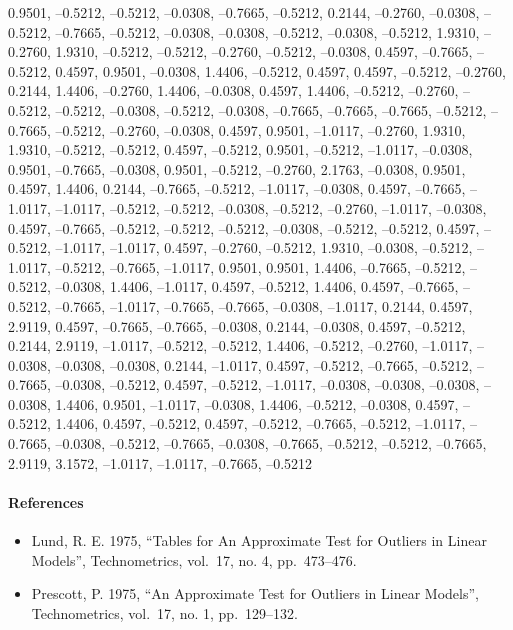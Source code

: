 \documentclass{article}
\begin{document}
0.9501, --0.5212, --0.5212, --0.0308, --0.7665, --0.5212, 0.2144,
--0.2760, --0.0308, --0.5212, --0.7665, --0.5212, --0.0308, --0.0308,
--0.5212, --0.0308, --0.5212, 1.9310, --0.2760, 1.9310, --0.5212,
--0.5212, --0.2760, --0.5212, --0.0308, 0.4597, --0.7665, --0.5212,
0.4597, 0.9501, --0.0308, 1.4406, --0.5212, 0.4597, 0.4597, --0.5212,
--0.2760, 0.2144, 1.4406, --0.2760, 1.4406, --0.0308, 0.4597, 1.4406,
--0.5212, --0.2760, --0.5212, --0.5212, --0.0308, --0.5212, --0.0308,
--0.7665, --0.7665, --0.7665, --0.5212, --0.7665, --0.5212, --0.2760,
--0.0308, 0.4597, 0.9501, --1.0117, --0.2760, 1.9310, 1.9310, --0.5212,
--0.5212, 0.4597, --0.5212, 0.9501, --0.5212, --1.0117, --0.0308,
0.9501, --0.7665, --0.0308, 0.9501, --0.5212, --0.2760, 2.1763,
--0.0308, 0.9501, 0.4597, 1.4406, 0.2144, --0.7665, --0.5212, --1.0117,
--0.0308, 0.4597, --0.7665, --1.0117, --1.0117, --0.5212, --0.5212,
--0.0308, --0.5212, --0.2760, --1.0117, --0.0308, 0.4597, --0.7665,
--0.5212, --0.5212, --0.5212, --0.0308, --0.5212, --0.5212, 0.4597,
--0.5212, --1.0117, --1.0117, 0.4597, --0.2760, --0.5212, 1.9310,
--0.0308, --0.5212, --1.0117, --0.5212, --0.7665, --1.0117, 0.9501,
0.9501, 1.4406, --0.7665, --0.5212, --0.5212, --0.0308, 1.4406,
--1.0117, 0.4597, --0.5212, 1.4406, 0.4597, --0.7665, --0.5212,
--0.7665, --1.0117, --0.7665, --0.7665, --0.0308, --1.0117, 0.2144,
0.4597, 2.9119, 0.4597, --0.7665, --0.7665, --0.0308, 0.2144, --0.0308,
0.4597, --0.5212, 0.2144, 2.9119, --1.0117, --0.5212, --0.5212, 1.4406,
--0.5212, --0.2760, --1.0117, --0.0308, --0.0308, --0.0308, 0.2144,
--1.0117, 0.4597, --0.5212, --0.7665, --0.5212, --0.7665, --0.0308,
--0.5212, 0.4597, --0.5212, --1.0117, --0.0308, --0.0308, --0.0308,
--0.0308, 1.4406, 0.9501, --1.0117, --0.0308, 1.4406, --0.5212,
--0.0308, 0.4597, --0.5212, 1.4406, 0.4597, --0.5212, 0.4597, --0.5212,
--0.7665, --0.5212, --1.0117, --0.7665, --0.0308, --0.5212, --0.7665,
--0.0308, --0.7665, --0.5212, --0.5212, --0.7665, 2.9119, 3.1572,
--1.0117, --1.0117, --0.7665, --0.5212

\paragraph{References}

\begin{itemize}
\item
  Lund, R. E. 1975, ``Tables for An Approximate Test for Outliers in
  Linear Models'', Technometrics, vol.~17, no. 4, pp.~473--476.
\item
  Prescott, P. 1975, ``An Approximate Test for Outliers in Linear
  Models'', Technometrics, vol.~17, no. 1, pp.~129--132.
\end{itemize}
\end{document}
